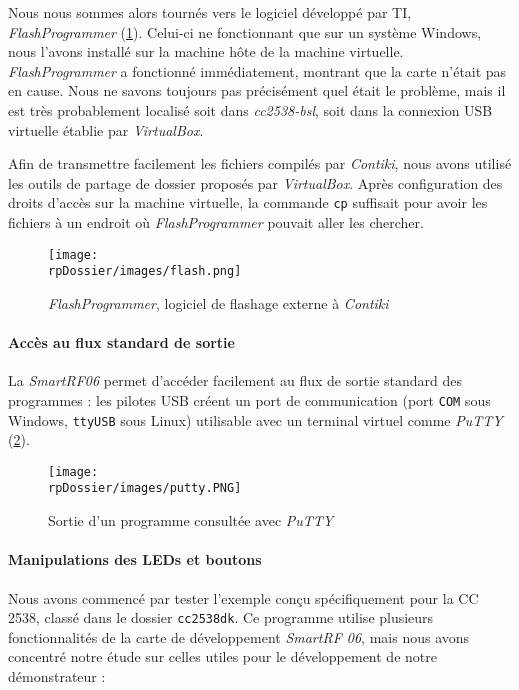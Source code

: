 Nous nous sommes alors tournés vers le logiciel développé par TI, \emph{FlashProgrammer} (\cref{flashprogrammer}).
Celui-ci ne fonctionnant que sur un système Windows, nous l’avons installé sur la machine hôte de la machine virtuelle.
\emph{FlashProgrammer} a fonctionné immédiatement, montrant que la carte n’était pas en cause.
Nous ne savons toujours pas précisément quel était le problème, mais il est très probablement localisé soit dans \emph{cc2538-bsl}, soit dans la connexion USB virtuelle établie par \emph{VirtualBox}.

Afin de transmettre facilement les fichiers compilés par \emph{Contiki}, nous avons utilisé les outils de partage de dossier proposés par \emph{VirtualBox}.
Après configuration des droits d’accès sur la machine virtuelle, la commande \texttt{cp} suffisait pour avoir les fichiers à un endroit où \emph{FlashProgrammer} pouvait aller les chercher.

\begin{figure}[H]
\centering
\texttt{[image: \\rpDossier/images/flash.png]}
\caption{\emph{FlashProgrammer}, logiciel de flashage externe à \emph{Contiki}}
\label{flashprogrammer}
\end{figure}

\paragraph{Accès au flux standard de sortie}

La \emph{SmartRF06} permet d’accéder facilement au flux de sortie standard des programmes : les pilotes USB créent un port de communication (port \texttt{COM} sous Windows, \texttt{ttyUSB} sous Linux) utilisable avec un terminal virtuel comme \emph{PuTTY} (\cref{putty}).

\begin{figure}[H]
\centering
\texttt{[image: \\rpDossier/images/putty.PNG]}
\caption{Sortie d’un programme consultée avec \emph{PuTTY}}
\label{putty}
\end{figure}

\paragraph{Manipulations des LEDs et boutons}

Nous avons commencé par tester l’exemple conçu spécifiquement pour la CC 2538, classé dans le dossier \texttt{cc2538dk}.
Ce programme utilise plusieurs fonctionnalités de la carte de développement \emph{SmartRF 06}, mais nous avons concentré notre étude sur celles utiles pour le développement de notre démonstrateur :

